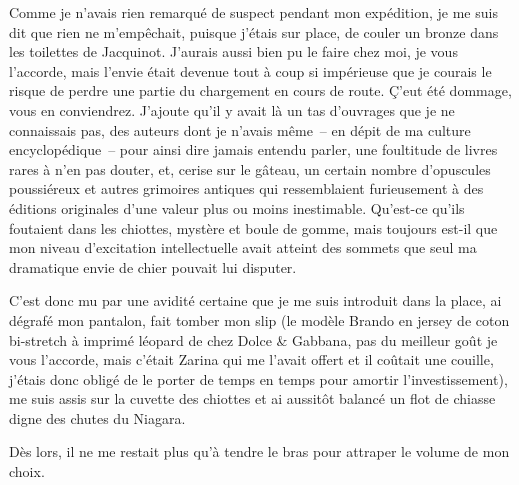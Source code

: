 Comme je n’avais rien remarqué de suspect pendant mon expédition, je me suis dit que rien ne m’empêchait, puisque j’étais sur place, de couler un bronze dans les toilettes de Jacquinot. J’aurais aussi bien pu le faire chez moi, je vous l’accorde, mais l’envie était devenue tout à coup si impérieuse que je courais le risque de perdre une partie du chargement en cours de route. Ç’eut été dommage, vous en conviendrez. J’ajoute qu’il y avait là un tas d’ouvrages que je ne connaissais pas, des auteurs dont je n’avais même~-- en dépit de ma culture encyclopédique~-- pour ainsi dire jamais entendu parler, une foultitude de livres rares à n’en pas douter, et, cerise sur le gâteau, un certain nombre d’opuscules poussiéreux et autres grimoires antiques qui ressemblaient furieusement à des éditions originales d’une valeur plus ou moins inestimable. Qu’est-ce qu’ils foutaient dans les chiottes, mystère et boule de gomme, mais toujours est-il que mon niveau d’excitation intellectuelle avait atteint des sommets que seul ma dramatique envie de chier pouvait lui disputer.

C’est donc mu par une avidité certaine que je me suis introduit dans la place, ai dégrafé mon pantalon, fait tomber mon slip (le modèle Brando en jersey de coton bi-stretch à imprimé léopard de chez Dolce \& Gabbana, pas du meilleur goût je vous l’accorde, mais c’était Zarina qui me l’avait offert et il coûtait une couille, j’étais donc obligé de le porter de temps en temps pour amortir l’investissement), me suis assis sur la cuvette des chiottes et ai aussitôt balancé un flot de chiasse digne des chutes du Niagara.

%
%
%
Dès lors, il ne me restait plus qu’à tendre le bras pour attraper le volume de mon choix.

